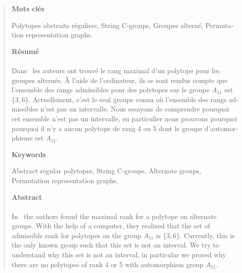 \cleardoublepage{}

\thispagestyle{plain}

\hspace{3cm}

\begin{quote}

\vfill{}

\begin{otherlanguage}{french}

\begin{center}
  \textbf{Mots clés}
\end{center}

Polytopes abstraits réguliers, String C-groups, Groupes alterné, Permutation representation graphs.

\begin{center}
  \textbf{Résumé}
\end{center}


\paragraph{}
Dans~\cite{highestRankOfAn} les auteurs ont trouvé le rang maximal d'un polytope pour les groupes alternés. À l'aide de l'ordinateur, ils se sont rendus compte que l'ensemble des rangs admissibles pour des polytopes sur le groupe $A_{11}$ est $\{3,6\}$. Actuellement, c'est le seul groupe connu où l'ensemble des rangs admissibles n'est pas un intervalle. Nous essayons de comprendre pourquoi cet ensemble n'est pas un intervalle, en particulier nous prouvons pourquoi pourquoi il n'y a aucun polytope de rang 4 ou 5 dont le groupe d'automorphisme est $A_{11}$.

\end{otherlanguage}

\vfill

\begin{center}
  \textbf{Keywords}
\end{center}

Abstract regular polytopes, String C-groups, Alternate groups, Permutation representation graphs.

\begin{center}
  \textbf{Abstract}
\end{center}

\paragraph{}
In~\cite{highestRankOfAn} the authors found the maximal rank for a polytope on alternate groups. With the help of a computer, they realized that the set of admissible rank for polytopes on the group $A_{11}$ is $\{3,6\}$. Currently, this is the only known group such that this set is not an interval. We try to understand why this set is not an interval, in particular we proved why there are no polytopes of rank 4 or 5 with automorphism group $A_{11}$.

\vfill

\end{quote}
